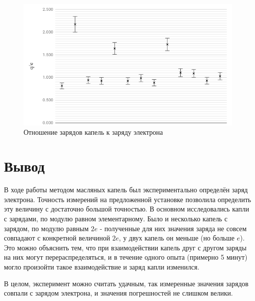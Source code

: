 \documentclass[a4paper]{article}
\begin{document}
\begin{enumerate}
    
 \begin{figure}[h]
    \centering
    \includegraphics[width=\textwidth]{graph1.PNG}
    \caption{Отношение зарядов капель к заряду электрона}
    \label{fig:vac}
\end{figure}
 
\end{enumerate}

\section{Вывод}

В ходе работы методом масляных капель был экспериментально определён заряд электрона. Точность измерений на предложенной установке позволила определить эту величину с достаточно большой точностью. В основном исследовались капли с зарядами, по модулю равном элементарному. Было и несколько капель с зарядом, по модулю равным $2e$ - полученные для них значения заряда не совсем совпадают с конкретной величиной $2e$, у двух капель он меньше (но больше $e$). Это можно объяснить тем, что при взаимодействии капель друг с другом заряды на них могут перераспределяться, и в течение одного опыта (примерно 5 минут) могло произойти такое взаимодействие и заряд капли изменился. \par
В целом, эксперимент можно считать удачным, так измеренные значения зарядов совпали с зарядом электрона, и значения погрешностей не слишком велики.
\end{document}
